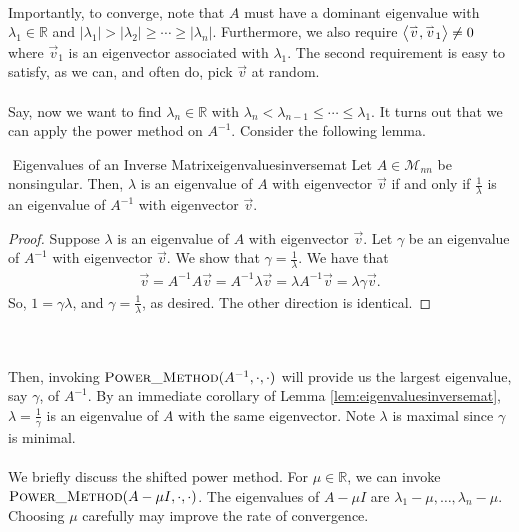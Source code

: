         \\
        Importantly, to converge, note that \(A\) must have a dominant eigenvalue with \(\lambda_1\in\mathbb{R}\) and \(|\lambda_1|>|\lambda_2|\geq\cdots\geq|\lambda_n|\). Furthermore, we also require \(\left\langle \overset{_{\rightharpoonup}}{v},\overset{_{\rightharpoonup}}{v}_1\right\rangle\neq0\) where \(\vec{v}_1\) is an eigenvector associated with \(\lambda_1\). The second requirement is easy to satisfy, as we can, and often do, pick \(\vec{v}\) at random.
        \\
        \\
        Say, now we want to find \(\lambda_n\in\mathbb{R}\) with \(\lambda_n<\lambda_{n-1}\leq\cdots\leq \lambda_1\). It turns out that we can apply the power method on \(A^{-1}\). Consider the following lemma.
        \begin{lemma}{\Stop\,\,Eigenvalues of an Inverse Matrix}{eigenvaluesinversemat}
            Let \(A\in\mathcal{M}_{nn}\) be nonsingular. Then, \(\lambda\) is an eigenvalue of \(A\) with eigenvector \(\vec{v}\) if and only if \(\frac{1}{\lambda}\) is an eigenvalue of \(A^{-1}\) with eigenvector \(\vec{v}\).
            \begin{proof}
                Suppose \(\lambda\) is an eigenvalue of \(A\) with eigenvector \(\vec{v}\). Let \(\gamma\) be an eigenvalue of \(A^{-1}\) with eigenvector \(\vec{v}\). We show that \(\gamma=\frac{1}{\lambda}\). We have that
                \begin{align*}
                    \vec{v}=A^{-1}A\vec{v}=A^{-1}\lambda\vec{v}=\lambda A^{-1}\vec{v}=\lambda\gamma\vec{v}.
                \end{align*}
                So, \(1=\gamma\lambda\), and \(\gamma=\frac{1}{\lambda}\), as desired. The other direction is identical.
            \end{proof}
        \end{lemma}
        \vphantom
        \\
        \\
        Then, invoking \(\Call{Power\_Method}{A^{-1},\cdot,\cdot}\) will provide us the largest eigenvalue, say \(\gamma\), of \(A^{-1}\). By an immediate corollary of Lemma \ref{lem:eigenvaluesinversemat}, \(\lambda=\frac{1}{\gamma}\) is an eigenvalue of \(A\) with the same eigenvector. Note \(\lambda\) is maximal since \(\gamma\) is minimal.
        \\
        \\
        We briefly discuss the shifted power method. For \(\mu\in\mathbb{R}\), we can invoke \(\Call{Power\_Method}{A-\mu I,\cdot,\cdot}\). The eigenvalues of \(A-\mu I\) are \(\lambda_1-\mu,\ldots,\lambda_n-\mu\). Choosing \(\mu\) carefully may improve the rate of convergence.
